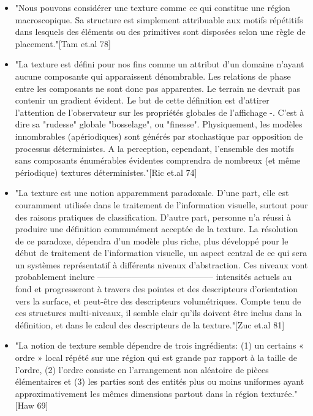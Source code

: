 \begin{itemize}
\item \indent "Nous pouvons considérer une texture comme ce qui constitue une région macroscopique. Sa structure est simplement attribuable aux motifs répétitifs dans lesquels des éléments ou des primitives sont disposées selon une règle de placement."[Tam et.al 78] \\ 

\item \indent "La texture est défini pour nos fins comme un attribut d'un domaine n'ayant aucune composante qui apparaissent dénombrable. Les relations de phase entre les composants ne sont donc pas apparentes. Le terrain ne devrait pas contenir un gradient évident. Le but de cette définition est d'attirer l'attention de l'observateur sur les propriétés globales de l'affichage -. C'est à dire sa "rudesse" globale "bosselage", ou "finesse". Physiquement, les modèles innombrables (apériodiques) sont générés par stochastique par opposition de processus déterministes. A la perception, cependant, l'ensemble des motifs sans composants énumérables évidentes comprendra de nombreux (et même périodique) textures déterministes."[Ric et.al 74]\\

\item \indent "La texture est une notion apparemment paradoxale. D'une part, elle est couramment utilisée dans le traitement de l'information visuelle, surtout pour des raisons pratiques de classification. D'autre part, personne n'a réussi à produire une définition communément acceptée de la texture. La résolution de ce paradoxe, dépendra d'un modèle plus riche, plus développé pour le début de traitement de l'information visuelle, un aspect central de ce qui sera un systèmes représentatif à différents niveaux d'abstraction. Ces niveaux vont probablement inclure
-----------------------------------------
 intensités actuels au fond et progresseront à travers des pointes et des descripteurs d’orientation vers la surface, et peut-être des descripteurs volumétriques. Compte tenu de ces structures multi-niveaux, il semble clair qu'ils doivent être inclus dans la définition, et dans le calcul des  descripteurs de la texture."[Zuc et.al 81]\\

\item \indent "La notion de texture semble dépendre de trois ingrédients: (1) un certains « ordre » local répété sur une région qui est grande par rapport à la taille de l'ordre, (2) l'ordre consiste en l'arrangement non aléatoire de pièces élémentaires et (3) les parties sont des entités plus ou moins uniformes ayant approximativement les mêmes dimensions partout dans la région texturée."[Haw 69]\\\\
\end{itemize}

